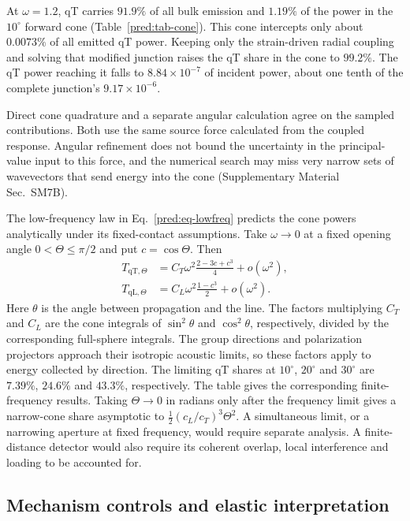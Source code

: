 \documentclass[10pt,aps,onecolumn,floatfix,notitlepage,nofootinbib,showkeys]{revtex4-2}
\newcommand{\qT}{\mathrm{qT}}
\newcommand{\qL}{\mathrm{qL}}
\begin{document}
At $\omega=1.2$, qT carries $91.9\%$ of all bulk emission and $1.19\%$ of the power in the $10^\circ$ forward cone (Table~\ref{pred:tab-cone}). This cone intercepts only about $0.0073\%$ of all emitted qT power. Keeping only the strain-driven radial coupling and solving that modified junction raises the qT share in the cone to $99.2\%$. The qT power reaching it falls to $8.84\times10^{-7}$ of incident power, about one tenth of the complete junction's $9.17\times10^{-6}$.

Direct cone quadrature and a separate angular calculation agree on the sampled contributions. Both use the same source force calculated from the coupled response. Angular refinement does not bound the uncertainty in the principal-value input to this force, and the numerical search may miss very narrow sets of wavevectors that send energy into the cone (Supplementary Material Sec.~SM7B).

The low-frequency law in Eq.~\eqref{pred:eq-lowfreq} predicts the cone powers analytically under its fixed-contact assumptions. Take $\omega\to0$ at a fixed opening angle $0<\Theta\leq\pi/2$ and put $c=\cos\Theta$. Then
\begin{align}
 T_{\qT,\Theta}&=C_T\omega^2\frac{2-3c+c^3}{4}+o(\omega^2),\nonumber\\
 T_{\qL,\Theta}&=C_L\omega^2\frac{1-c^3}{2}+o(\omega^2).
 \label{pred:eq-cone-lowfreq}
\end{align}
Here $\theta$ is the angle between propagation and the line. The factors multiplying $C_T$ and $C_L$ are the cone integrals of $\sin^2\theta$ and $\cos^2\theta$, respectively, divided by the corresponding full-sphere integrals. The group directions and polarization projectors approach their isotropic acoustic limits, so these factors apply to energy collected by direction. The limiting qT shares at $10^\circ$, $20^\circ$ and $30^\circ$ are $7.39\%$, $24.6\%$ and $43.3\%$, respectively. The table gives the corresponding finite-frequency results. Taking $\Theta\to0$ in radians only after the frequency limit gives a narrow-cone share asymptotic to $\tfrac12(c_L/c_T)^3\Theta^2$. A simultaneous limit, or a narrowing aperture at fixed frequency, would require separate analysis. A finite-distance detector would also require its coherent overlap, local interference and loading to be accounted for.

\subsection{Mechanism controls and elastic interpretation}
\label{sec:s6-controls}
\end{document}
